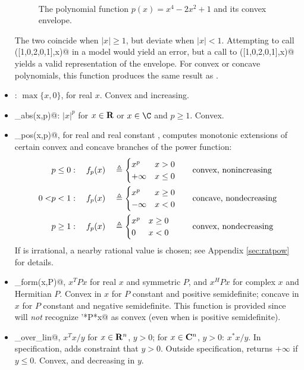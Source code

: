 \documentclass[12pt]{article}
\begin{document}
\begin{itemize}
\begin{figure}
\begin{center}
\end{center}
~\\[-48pt]
\caption{The polynomial function $p(x)=x^4-2x^2+1$ and its convex envelope.}
\label{fig:envelope}
\end{figure}
The two coincide when $|x|\geq 1$, but deviate when $|x|<1$. Attempting to call
\verb@polyval([1,0,2,0,1],x)@ in a \cvx model would  yield an error,
but a call to \verb@polyenv([1,0,2,0,1],x)@ yields a valid 
representation of the envelope. For convex or concave polynomials,
this function produces the same result as \verb@polyval@.
\item \verb@pos@: $\max\{x,0\}$, for real $x$. 
Convex and increasing.
\item \verb@pow_abs(x,p)@: $|x|^p$ for $x\in\R$ or $x\in\C$ and $p\geq 1$. Convex.
\item \verb@pow_pos(x,p)@, for real \verb@x@ and real constant \verb@p@,
computes monotonic extensions of certain convex and concave branches of
the power function:
\begin{equation*}
	\begin{aligned}
	&p \leq 0: \quad  
	f_p(x) &&\triangleq \begin{cases}  x^p & x > 0 \\ +\infty & x \leq 0  \end{cases} 
	&& \quad \text{convex, nonincreasing} \\
	0 <  &p < 1: \quad
	f_p(x) &&\triangleq\begin{cases}  x^p & x \geq 0 \\ -\infty & x < 0  \end{cases} 
	&& \quad  \text{concave, nondecreasing} \\
	&p \geq 1: \quad
	f_p(x) && \triangleq\begin{cases}  x^p & x \geq 0 \\ 0 & x < 0  \end{cases}
	&& \quad \text{convex, nondecreasing}
	\end{aligned}
\end{equation*}
If \verb@p@ is irrational, a nearby rational value is chosen;
see Appendix \ref{sec:ratpow} for details.
\item \verb@quad_form(x,P)@, $x^TPx$ for real $x$ and symmetric $P$,
and $x^HPx$ for complex $x$ and Hermitian $P$.
Convex in $x$ for $P$ constant and positive semidefinite;
concave in $x$ for $P$ constant and negative semidefinite.
This function is provided since \cvx will \emph{not}
recognize \verb@x'*P*x@ as convex (even when \verb@P@ is 
positive semidefinite).
\item \verb@quad_over_lin@, $x^Tx/y$ for $x \in \R^n$, $y >0$;
for $x \in \mathbf{C}^n$, $y>0$: $x^*x/y$.  In \cvx specification,
adds constraint that $y>0$.  Outside \cvx specification,
returns $+\infty$ if $y\leq 0$.
Convex, and decreasing in $y$.

\end{itemize}
\end{document}
